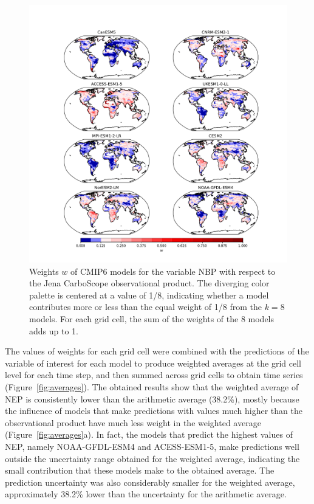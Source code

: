 \documentclass[gmd, manuscript]{copernicus}
\begin{document}
\begin{figure}[htbp]
   \centering
   \includegraphics[width=14cm, trim={3cm, 1cm, 2.5cm, 1cm}, clip]{Figures/CMIP6_CarboScope_weights.pdf} %
   \caption{Weights $w$ of CMIP6 models for the variable NBP with respect to the Jena CarboScope observational product. The diverging color palette is centered at a value of 1/8,  indicating whether a model contributes more or less than the equal weight of 1/8 from the $k= 8$ models. For each grid cell, the sum of the weights of the 8 models adds up to 1. }
   \label{fig:wCarboScope}
\end{figure}

\clearpage

The values of weights for each grid cell were combined with the predictions of the variable of interest for each model to produce weighted averages at the grid cell level for each time step, and then summed across grid cells to obtain time series (Figure~\ref{fig:averages}).
The obtained results show that the weighted average of NEP  is consistently lower than the arithmetic average (38.2\%), mostly because the influence of models that make predictions with values much higher than the observational product have much less weight in the weighted average (Figure~\ref{fig:averages}a). In fact, the models that predict the highest values of NEP, namely NOAA-GFDL-ESM4 and ACESS-ESM1-5, make predictions well outside the uncertainty range obtained for the weighted average, indicating the small contribution that these models make to the obtained average. The prediction uncertainty was also considerably smaller for the weighted average, approximately 38.2\% lower than the uncertainty for the arithmetic average. 
\end{document}

